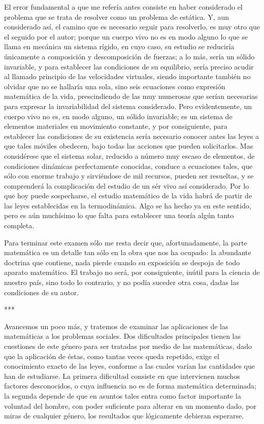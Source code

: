 \documentclass[a4paper, 12pt]{article}
\begin{document}
El error fundamental a que me refería antes consiste en haber considerado el problema que se trata de resolver como un problema de estática. Y, aun considerado así, el camino que es necesario seguir para resolverlo, es muy otro que el seguido por el autor; porque un cuerpo vivo no es en modo alguno lo que se llama en mecánica un sistema rígido, en cuyo caso, su estudio se reduciría únicamente a composición y descomposición de fuerzas; a lo más, sería un sólido invariable, y para establecer las condiciones de su equilibrio, sería preciso acudir al llamado principio de las velocidades virtuales, siendo importante también no olvidar que no se hallaría una sola, sino seis ecuaciones como expresión matemática de la vida, prescindiendo de las muy numerosas que serían necesarias para expresar la invariabilidad del sistema considerado. Pero evidentemente, un cuerpo vivo no es, en modo alguno, un sólido invariable; es un sistema de elementos materiales en movimiento constante, y por consiguiente, para establecer las condiciones de su existencia sería necesario conocer antes las leyes a que tales móviles obedecen, bajo todas las acciones que pueden solicitarlos. Mas considérese que el sistema solar, reducido a número muy escaso de elementos, de condiciones dinámicas perfectamente conocidas, conduce a ecuaciones tales, que sólo con enorme trabajo y sirviéndose de mil recursos, pueden ser resueltas, y se comprenderá la complicación del estudio de un sér vivo así considerado. Por lo que hoy puede sospecharse, el estudio matemático de la vida habrá de partir de las leyes establecidas en la termodinámica. Algo se ha hecho ya en este sentido, pero es aún muchísimo lo que falta para establecer una teoría algún tanto completa.

Para terminar este examen sólo me resta decir que, afortunadamente, la parte matemática es un detalle tan sólo en la obra que nos ha ocupado: la abundante doctrina que contiene, nada pierde cuando su exposición se despoja de todo aparato matemático. El trabajo no será, por consiguiente, inútil para la ciencia de nuestro país, sino todo lo contrario, y no podía suceder otra cosa, dadas las condiciones de su autor.

\bigskip

\centerline{***}


Avancemos un poco más, y tratemos de examinar las aplicaciones de las matemáticas a los problemas sociales. Dos dificultades principales tienen las cuestiones de este género para ser tratadas por medio de las matemáticas, dado que la aplicación de éstas, como tantas veces queda repetido, exige el conocimiento exacto de las leyes, conforme a las cuales varían las cantidades que han de estudiarse. La primera dificultad consiste en que intervienen muchos factores desconocidos, o cuya influencia no es de forma matemática determinada; la segunda depende de que en asuntos tales entra como factor importante la voluntad del hombre, con poder suficiente para alterar en un momento dado, por miras de cualquier género, los resultados que lógicamente debieran esperarse.
\end{document}
